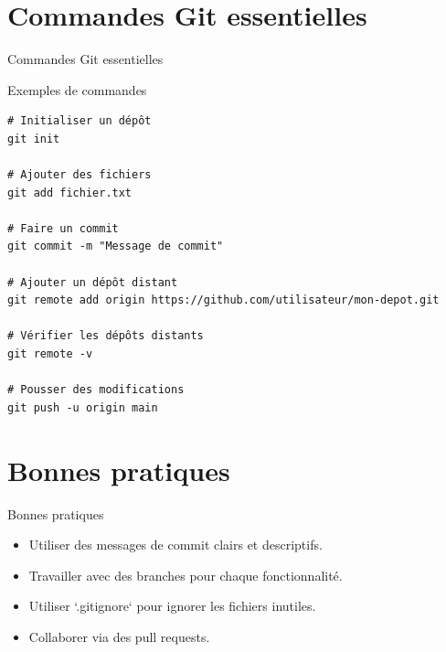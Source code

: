 \documentclass{clbeamer2024}
\begin{document}
\section{Commandes Git essentielles}

\begin{frame}[fragile]{Commandes Git essentielles}
	\begin{exampleblock}{Exemples de commandes}
		\begin{verbatim}
# Initialiser un dépôt
git init
			
# Ajouter des fichiers
git add fichier.txt
			
# Faire un commit
git commit -m "Message de commit"
			
# Ajouter un dépôt distant
git remote add origin https://github.com/utilisateur/mon-depot.git
			
# Vérifier les dépôts distants
git remote -v
			
# Pousser des modifications
git push -u origin main
		\end{verbatim}
	\end{exampleblock}
\end{frame}


\section{Bonnes pratiques}
\begin{frame}{Bonnes pratiques}
	\begin{itemize}
		\item Utiliser des messages de commit clairs et descriptifs.
		\item Travailler avec des branches pour chaque fonctionnalité.
		\item Utiliser `.gitignore` pour ignorer les fichiers inutiles.
		\item Collaborer via des pull requests.
	\end{itemize}
\end{frame}
\end{document}
